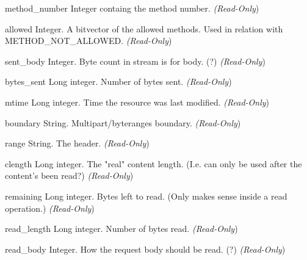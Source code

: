 \begin{memberdesc}[Request]{method_number}
Integer containg the method number.
\emph{(Read-Only})
\end{memberdesc}

\begin{memberdesc}[Request]{allowed}
Integer. A bitvector of the allowed methods. Used in relation with
METHOD_NOT_ALLOWED.
\emph{(Read-Only})
\end{memberdesc}

\begin{memberdesc}[Request]{sent_body}
Integer. Byte count in stream is for body. (?)
\emph{(Read-Only})
\end{memberdesc}

\begin{memberdesc}[Request]{bytes_sent}
Long integer. Number of bytes sent.
\emph{(Read-Only})
\end{memberdesc}

\begin{memberdesc}[Request]{mtime}
Long integer. Time the resource was last modified.
\emph{(Read-Only})
\end{memberdesc}

\begin{memberdesc}[Request]{boundary}
String. Multipart/byteranges boundary.
\emph{(Read-Only})
\end{memberdesc}

\begin{memberdesc}[Request]{range}
String. The  header.
\emph{(Read-Only})
\end{memberdesc}

\begin{memberdesc}[Request]{clength}
Long integer. The "real" content length. (I.e. can only be used after
the content's been read?)
\emph{(Read-Only})
\end{memberdesc}

\begin{memberdesc}[Request]{remaining}
Long integer. Bytes left to read. (Only makes sense inside a read
operation.)
\emph{(Read-Only})
\end{memberdesc}

\begin{memberdesc}[Request]{read_length}
Long integer. Number of bytes read.
\emph{(Read-Only})
\end{memberdesc}

\begin{memberdesc}[Request]{read_body}
Integer. How the request body should be read. (?)
\emph{(Read-Only})
\end{memberdesc}


